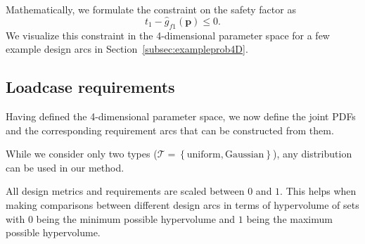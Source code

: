 Mathematically, we formulate the constraint on the safety factor as
%
\begin{equation}
	t_1 - \hat{g}_{f1}(\mathbf{p})\le 0.
\end{equation}
%
We visualize this constraint in the 4-dimensional parameter space for a few example design arcs in Section~\ref{subsec:exampleprob4D}.

\subsection{Loadcase requirements} \label{subsec:loadcasereq}

Having defined the 4-dimensional parameter space, we now define the joint \acp{PDF} and the corresponding requirement arcs that can be constructed from them. 

While we consider only two types ($\mathcal{T} = \left\{\textrm{uniform}, \textrm{Gaussian}\right\}$), any distribution can be used in our method.

All design metrics and requirements are scaled between $0$ and $1$. This helps when making comparisons between different design arcs in terms of hypervolume of sets with $0$ being the minimum possible hypervolume and $1$ being the maximum possible hypervolume.

